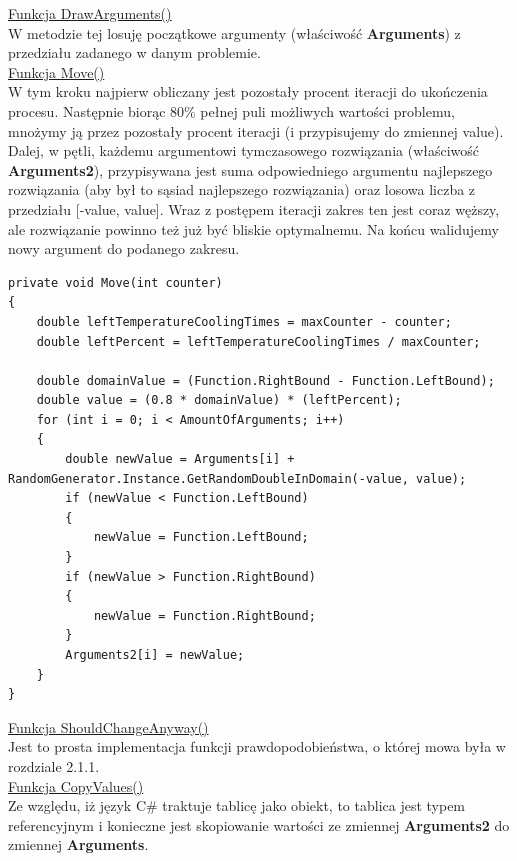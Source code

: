 \documentclass[twoside]{projektInzynierskiMS1}
\newcommand{\si}{ś}
\begin{document}
\underline{Funkcja DrawArguments()} \\
W metodzie tej losuję początkowe argumenty (wła\si ciwo\si ć \textbf{Arguments}) z przedziału zadanego w danym problemie. \\

\underline{Funkcja Move()} \\
W tym kroku najpierw obliczany jest pozostały procent iteracji do ukończenia procesu. Następnie biorąc 80\% pełnej puli możliwych warto\si ci problemu, mnożymy ją przez pozostały procent iteracji (i przypisujemy do zmiennej value). Dalej, w pętli, każdemu argumentowi tymczasowego rozwiązania (wła\si ciwo\si ć \textbf{Arguments2}), przypisywana jest suma odpowiedniego argumentu najlepszego rozwiązania (aby był to sąsiad najlepszego rozwiązania) oraz losowa liczba z przedziału [-value, value]. Wraz z postępem iteracji zakres ten jest coraz węższy, ale rozwiązanie powinno też już być bliskie optymalnemu. Na końcu walidujemy nowy argument do podanego zakresu. \\
\begin{verbatim}
private void Move(int counter)
{
    double leftTemperatureCoolingTimes = maxCounter - counter;
    double leftPercent = leftTemperatureCoolingTimes / maxCounter;

    double domainValue = (Function.RightBound - Function.LeftBound);
    double value = (0.8 * domainValue) * (leftPercent);
    for (int i = 0; i < AmountOfArguments; i++)
    {
        double newValue = Arguments[i] + 
RandomGenerator.Instance.GetRandomDoubleInDomain(-value, value);
        if (newValue < Function.LeftBound)
        {
            newValue = Function.LeftBound;
        }
        if (newValue > Function.RightBound)
        {
            newValue = Function.RightBound;
        }
        Arguments2[i] = newValue;
    }
}
\end{verbatim}

\underline{Funkcja ShouldChangeAnyway()} \\
Jest to prosta implementacja funkcji prawdopodobieństwa, o której mowa była w rozdziale 2.1.1. \\

\underline{Funkcja CopyValues()} \\
Ze względu, iż język C\# traktuje tablicę jako obiekt, to tablica jest typem referencyjnym i konieczne jest skopiowanie warto\si ci ze zmiennej \textbf{Arguments2} do zmiennej \textbf{Arguments}. \\
\end{document}
